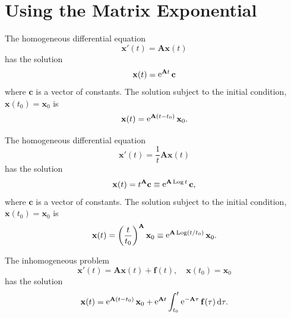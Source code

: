 \section{Using the Matrix Exponential}





The homogeneous differential equation
\[
\mathbf{x}'(t) = \mathbf{A} \mathbf{x}(t)
\]
has the solution
\[
\mathbf{x}(t) = \mathop{\mathrm{e}}\nolimits^{\mathbf{A} t} \mathbf{c}
\]
where $\mathbf{c}$ is a vector of constants.  The solution subject to the initial
condition, $\mathbf{x}(t_0) = \mathbf{x}_0$ is
\[
\mathbf{x}(t) = \mathop{\mathrm{e}}\nolimits^{\mathbf{A} (t - t_0)} \mathbf{x}_0.
\]

The homogeneous differential equation
\[
\mathbf{x}'(t) = \frac{1}{t} \mathbf{A} \mathbf{x}(t)
\]
has the solution
\[
\mathbf{x}(t) = t^{\mathbf{A}} \mathbf{c} \equiv \mathop{\mathrm{e}}\nolimits^{\mathbf{A} \mathop{\mathrm{Log}}\nolimits t} \mathbf{c},
\]
where $\mathbf{c}$ is a vector of constants.  The solution subject to the initial
condition, $\mathbf{x}(t_0) = \mathbf{x}_0$ is
\[
\mathbf{x}(t) = \left( \frac{t}{t_0} \right)^{\mathbf{A}} \mathbf{x}_0
\equiv \mathop{\mathrm{e}}\nolimits^{\mathbf{A} \mathop{\mathrm{Log}}\nolimits(t / t_0)} \mathbf{x}_0.
\]

The inhomogeneous problem
\[
\mathbf{x}'(t) = \mathbf{A} \mathbf{x}(t) + \mathbf{f}(t), \quad \mathbf{x}(t_0) = \mathbf{x}_0
\]
has the solution
\[
\mathbf{x}(t) = \mathop{\mathrm{e}}\nolimits^{\mathbf{A} (t - t_0)} \mathbf{x}_0 
+ \mathop{\mathrm{e}}\nolimits^{\mathbf{A} t} \int_{t_0}^t \mathop{\mathrm{e}}\nolimits^{-\mathbf{A} \tau} \mathbf{f}(\tau) \,\mathrm{d} \tau.
\]










